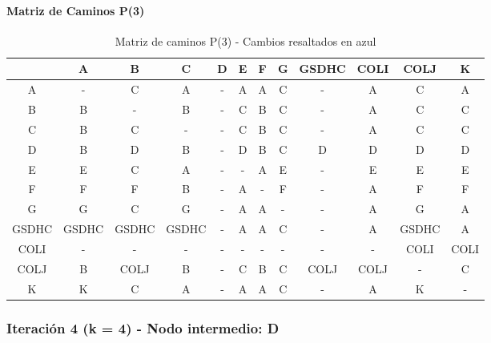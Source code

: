 \documentclass[12pt]{article}
\begin{document}
\paragraph{Matriz de Caminos P(3)}
\begin{table}[h!]
\centering
\begin{tabular}{|c|c|c|c|c|c|c|c|c|c|c|c|}
\hline
 & A & B & C & D & E & F & G & GSDHC & COLI & COLJ & K \\\hline
A & - & \cellcolor{lightblue} C & A & - & A & A & \cellcolor{lightblue} C & - & A & \cellcolor{lightblue} C & A \\\hline
B & B & - & B & - & \cellcolor{lightblue} C & B & \cellcolor{lightblue} C & - & A & \cellcolor{lightblue} C & \cellcolor{lightblue} C \\\hline
C & B & C & - & - & C & B & C & - & A & C & C \\\hline
D & B & D & B & - & D & B & \cellcolor{lightblue} C & D & D & D & D \\\hline
E & E & \cellcolor{lightblue} C & A & - & - & A & E & - & E & E & E \\\hline
F & F & F & B & - & A & - & F & - & A & F & F \\\hline
G & G & \cellcolor{lightblue} C & G & - & A & A & - & - & A & G & A \\\hline
GSDHC & GSDHC & GSDHC & GSDHC & - & A & A & \cellcolor{lightblue} C & - & A & GSDHC & A \\\hline
COLI & - & - & - & - & - & - & - & - & - & COLI & COLI \\\hline
COLJ & B & COLJ & B & - & \cellcolor{lightblue} C & B & \cellcolor{lightblue} C & COLJ & COLJ & - & \cellcolor{lightblue} C \\\hline
K & K & \cellcolor{lightblue} C & A & - & A & A & \cellcolor{lightblue} C & - & A & K & - \\\hline
\end{tabular}
\caption{Matriz de caminos P(3) - Cambios resaltados en azul}
\end{table}

\subsubsection{Iteración 4 (k = 4) - Nodo intermedio: D}
\end{document}
